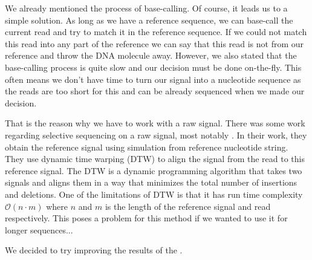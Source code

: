 
We already mentioned the process of base-calling. Of course, it leads us to a simple
solution. As long as we have a reference sequence, we can base-call the current read
and try to match it in the reference sequence. If we could not match this read
into any part of the reference we can say that this read is not from our reference
and throw the DNA molecule away. However, we also stated that the base-calling process
is quite slow and our decision must be done on-the-fly. This often means we don't
have time to turn our signal into a nucleotide sequence as the reads are too short for this
and can be already sequenced when we made our decision.

That is the reason why we have to work with a raw signal. There was some work
regarding selective sequencing on a raw signal, most notably \cite{loose2016real}. In their
work, they obtain the reference signal using simulation from reference nucleotide
string. They use dynamic time warping (DTW) to align the signal from the read to
this reference signal. The DTW is a dynamic programming algorithm that takes two signals and aligns them in a
way that minimizes the total number of insertions and deletions. One of the limitations
of DTW is that it has run time complexity $\mathcal{O}(n\cdot m)$ where $n$ and $m$
is the length of the reference signal and read respectively. This poses a problem
for this method if we wanted to use it for longer sequences...

We decided to try improving the results of the \cite{loose2016real}.

